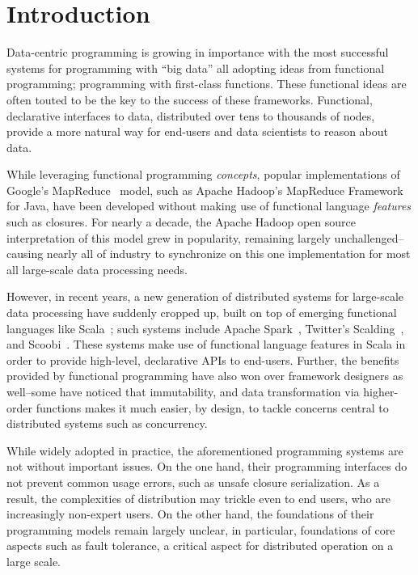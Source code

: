 \documentclass{jfp1}
\begin{document}
\tableofcontents

\section{Introduction}

Data-centric programming is growing in importance with the most successful systems for
programming with ``big data'' all adopting ideas from functional
programming; \ie programming with first-class functions. These functional
ideas are often touted to be the key to the success of these frameworks. Functional, 
declarative interfaces to data,
distributed over tens to thousands of nodes, provide a more natural way for
end-users and data scientists to reason about data.

While leveraging functional programming {\em concepts}, popular implementations
of \\Google's MapReduce~\cite{MapReduce} model, such as Apache Hadoop's MapReduce
Framework~\cite{Hadoop} for Java, have been developed without making use of
functional language {\em features} such as closures. For nearly a decade, the
Apache Hadoop open source interpretation of this model grew in popularity,
remaining largely unchallenged--causing nearly all of industry to synchronize on
this one implementation for most all large-scale data processing needs.

However, in recent years, a new generation of distributed systems for
large-scale data processing have suddenly cropped up, built on top of emerging
functional languages like Scala~\cite{Odersky10}; such systems include Apache
Spark~\cite{Spark}, Twitter's Scalding~\cite{Scalding}, and
Scoobi~\cite{Scoobi}. These systems make use of functional language features in
Scala in order to provide high-level, declarative APIs to end-users. Further,
the benefits provided by functional programming have also won over framework
designers as well--some have noticed that immutability, and data transformation
via higher-order functions makes it much easier, by design, to tackle concerns
central to distributed systems such as concurrency.

While widely adopted in practice, the aforementioned programming systems are not
without important issues. On the one hand, their programming interfaces do not
prevent common usage errors, such as unsafe closure serialization. As a result,
the complexities of distribution may trickle even to end users, who are
increasingly non-expert users. On the other hand, the foundations of their
programming models remain largely unclear, in particular, foundations of core
aspects such as fault tolerance, a critical aspect for distributed operation on
a large scale.
\end{document}
